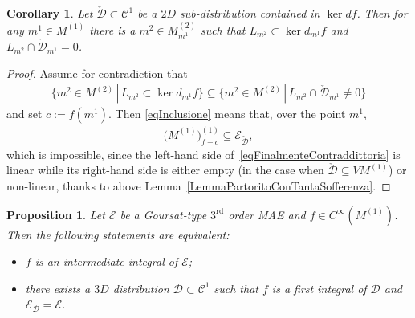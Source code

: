 \documentclass[10pt,a4paper]{amsart}
\newcommand{\C}{\mathcal{C}}
\newcommand{\D}{\mathcal{D}}
\newcommand{\E}{\mathcal{E}}
\newcommand{\Rd}{^\textrm{rd}}
\newcommand{\Ddue}{{\check{\mathcal{D}}}}
\numberwithin{equation}{section}
\newtheorem{Corollary}[Theorem]{Corollary}
\newtheorem{Proposition}[Theorem]{Proposition}
 { \theoremstyle{definition}
\newtheorem{Definition}[Theorem]{Definition}
\newtheorem{Example}[Theorem]{Example}
\newtheorem{Remark}[Theorem]{Remark} }
\begin{document}
\begin{Corollary}\label{corollarioUnPoPesante}
 Let $\Ddue\subset\C^1$ be a $2D$ sub-distribution contained in $\ker d f$. Then for any \mbox{$m^1\in M^{(1)}$} there is a $m^2\in M^{(2)}_{m^1}$ such that $L_{m^2}\subset \ker d_{m^1}f$ and $L_{m^2}\cap \Ddue_{m^1}=0$.
\end{Corollary}

\begin{proof}
 Assume for contradiction that
 \begin{gather}\label{eqInclusione}
\big\{m^2\in M^{(2)}\,|\, L_{m^2}\subset \ker d_{m^1}f\big\}\subseteq \big\{m^2\in M^{(2)}\,|\, L_{m^2}\cap \Ddue_{m^1}\neq 0\big\}
\end{gather}
and set $c:=f(m^1)$. Then \eqref{eqInclusione} means that, over the point $m^1$,
 \begin{gather}\label{eqFinalmenteContraddittoria}
 \big(M^{(1)}\big)_{f-c}^{(1)}\subseteq \E_\Ddue ,
\end{gather}
which is impossible, since the left-hand side of~\eqref{eqFinalmenteContraddittoria} is linear while its right-hand side is either empty (in the case when $\Ddue\subseteq VM^{(1)}$) or non-linear, thanks to above Lemma~\ref{LemmaPartoritoConTantaSofferenza}.
\end{proof}

\begin{Proposition}\label{propIntInt}
 Let $\E$ be a Goursat-type $3\Rd$ order MAE and $f\in C^\infty(M^{(1)})$. Then
 the following statements are equivalent:
 \begin{itemize}\itemsep=0pt
 \item $f$ is an intermediate integral of $\E$;
\item there exists a $3D$ distribution $\D\subset\C^1$ such that $f$ is a first integral of $\D$ and $\E_\D=\E$.
\end{itemize}
\end{Proposition}
\end{document}

